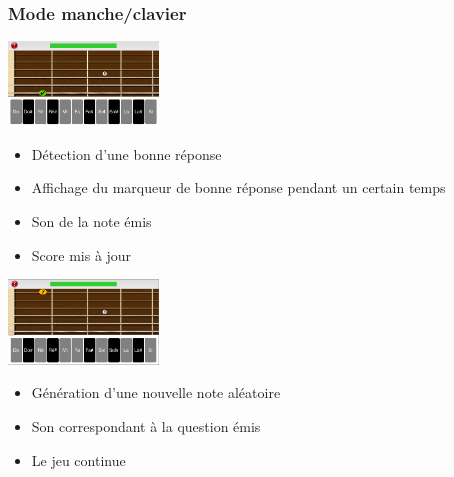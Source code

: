 \documentclass{beamer}
\begin{document}
		\begin{frame}
			\frametitle{Mode manche/clavier}


			\begin{minipage}{0.35\linewidth}
				\includegraphics[width=4cm]{images/clavier_good_answer2.png}
			\end{minipage}\hfill
			\begin{minipage}{0.6\linewidth}
				
				\begin{itemize}
					\item Détection d'une bonne réponse
					\item Affichage du marqueur de bonne réponse pendant un certain temps
					\item Son de la note émis
					\item Score mis à jour
				\end{itemize}
			\end{minipage}
			\bigbreak
			\pause
			\begin{minipage}{0.35\linewidth}
				\includegraphics[width=4cm]{images/clavier_question.png}
			\end{minipage}\hfill
			\begin{minipage}{0.6\linewidth}
				
				\begin{itemize}
					\item Génération d'une nouvelle note aléatoire
					\item Son correspondant à la question émis 
					\item Le jeu continue
				\end{itemize}
			\end{minipage}


			\bigbreak

		\end{frame}	
\end{document}
